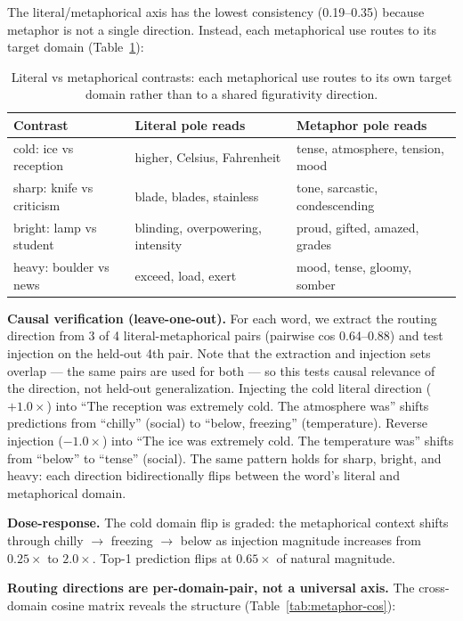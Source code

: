 \documentclass[11pt]{article}
\begin{document}
The literal/metaphorical axis has the lowest consistency (0.19--0.35) because
metaphor is not a single direction. Instead, each metaphorical use routes to
its target domain (Table~\ref{tab:metaphor}):

\begin{table}[htbp]
\centering
\small
\begin{tabular}{lll}
\toprule
Contrast & Literal pole reads & Metaphor pole reads \\
\midrule
cold: ice vs reception & higher, Celsius, Fahrenheit & tense, atmosphere, tension, mood \\
sharp: knife vs criticism & blade, blades, stainless & tone, sarcastic, condescending \\
bright: lamp vs student & blinding, overpowering, intensity & proud, gifted, amazed, grades \\
heavy: boulder vs news & exceed, load, exert & mood, tense, gloomy, somber \\
\bottomrule
\end{tabular}
\caption{Literal vs metaphorical contrasts: each metaphorical use routes to its own target domain rather than to a shared figurativity direction.}
\label{tab:metaphor}
\end{table}

\textbf{Causal verification (leave-one-out).} For each word, we extract the
routing direction from 3 of 4 literal-metaphorical pairs (pairwise cos
0.64--0.88) and test injection on the held-out 4th pair. Note that the extraction and injection sets overlap ---
the same pairs are used for both --- so this tests causal relevance of the
direction, not held-out generalization. Injecting the cold literal direction ($+1.0\times$) into ``The
reception was extremely cold. The atmosphere was'' shifts predictions from
``chilly'' (social) to ``below, freezing'' (temperature). Reverse injection
($-1.0\times$) into ``The ice was extremely cold. The temperature was'' shifts from
``below'' to ``tense'' (social). The same pattern holds for sharp, bright,
and heavy: each direction bidirectionally flips between the word's literal
and metaphorical domain.

\textbf{Dose-response.} The cold domain flip is graded: the metaphorical context
shifts through chilly $\rightarrow$ freezing $\rightarrow$ below as injection magnitude increases
from $0.25\times$ to $2.0\times$. Top-1 prediction flips at $0.65\times$ of natural magnitude.

\textbf{Routing directions are per-domain-pair, not a universal axis.} The
cross-domain cosine matrix reveals the structure (Table~\ref{tab:metaphor-cos}):
\end{document}
